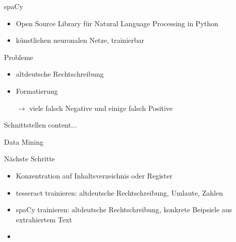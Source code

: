 \documentclass{beamer}
\begin{document}
\begin{frame}{spaCy}
	\begin{itemize}
		\item Open Source Library für Natural Language Processing in Python
		\item künstlichen neuronalen Netze, trainierbar
	\end{itemize}
\begin{block}{Probleme}
	\begin{itemize}
	\item altdeutsche Rechtschreibung
	\item Formatierung
	\item[$\rightarrow $ ] viele falsch Negative und einige falsch Positive
	\end{itemize}
\end{block}
\end{frame}
\begin{frame}{Schnittstellen}
	content...
\end{frame}
\begin{frame}{Data Mining}
\end{frame}
\begin{frame}{Nächste Schritte}
	\begin{itemize}
		\item Konzentration auf Inhaltsverzeichnis oder Register
		\item tesseract trainieren: altdeutsche Rechtschreibung, Umlaute, Zahlen
		\item spaCy trainieren: altdeutsche Rechtschreibung, konkrete Beipsiele aus extrahiertem Text
		\item 

	\end{itemize}
\end{frame}
\end{document}
